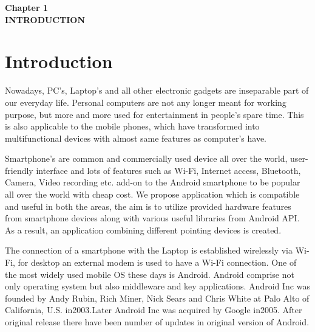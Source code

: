 \documentclass[12pt]{article}
\begin{document}
\clearpage

	
\begin{center}
 \LARGE \textbf {Chapter 1 }\\[10mm]
 \Large \textbf{INTRODUCTION}\\[10mm]
 \end{center}
 \section{Introduction}\par
Nowadays, PC’s, Laptop’s and all other electronic gadgets are inseparable part of  our everyday life. Personal computers are not any longer meant for working  purpose, but more and more used for entertainment in people’s spare time. This is also applicable to the mobile phones, which have transformed into multifunctional devices with almost same features as computer’s have. \par
Smartphone's are common and commercially used device all over the world, user-
friendly interface and lots of features such as Wi-Fi, Internet access, Bluetooth,
Camera, Video recording etc. add-on to the Android smartphone to be popular all
over the world with cheap cost. We propose application which is compatible and
useful in both the areas, the aim is to utilize provided hardware features from
smartphone devices along with various useful libraries from Android API. As a
result, an application combining different pointing devices is created.\par 
The connection of a smartphone with the Laptop is established wirelessly via Wi-
Fi, for desktop an external modem is used to have a Wi-Fi connection. One of the
most widely used mobile OS these days is Android. Android comprise not only
operating system but also middleware and key applications. Android Inc was
founded by Andy Rubin, Rich Miner, Nick Sears and Chris White at Palo Alto of
California, U.S. in2003.Later Android Inc was acquired by Google in2005. After
original release there have been number of updates in original version of Android.\\[2mm]\par
\end{document}
